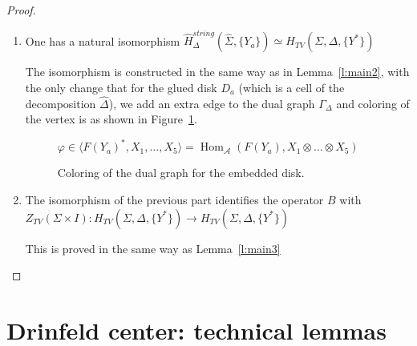 \documentclass{amsart}
\theoremstyle{definition}
\theoremstyle{remark}
\numberwithin{equation}{section}
\newcommand{\firef}[1]{Figure~{\rm\ref{#1}}}
\newcommand{\thref}[1]{Theorem~{\rm\ref{#1}}}
\newcommand{\leref}[1]{Lemma~{\rm\ref{#1}}}
\newcommand{\<}{\langle}
\renewcommand{\>}{\rangle}
\renewcommand{\i}{{\mathrm{i}}}   %
\newcommand{\A}{\mathcal{A}}      %
\newcommand{\Ga}{\Gamma}
\newcommand{\De}{\Delta}
\newcommand{\ph}{\varphi}
\newcommand{\Si}{\Sigma}
\newcommand{\Sihat}{\widehat{\Sigma}}
\newcommand{\Hs}{H^{string}}
\newcommand{\Hhs}{\hat{H}^{string}}
\newcommand{\HhsD}{\hat{H}^{string}_\De}
\newcommand{\HTV}{H_{TV}}
\newcommand{\ZTV}{Z_{TV}}
\DeclareMathOperator{\Hom}{Hom}
\DeclareMathOperator{\im}{Im}
\begin{document}
\begin{proof}
\begin{enumerate}
Then operators $B_p$ are mutually commuting projectors, and we have a
natural isomorphism  
$$
\Hs(\Si, \{Y_a\})\simeq \Hhs(\Sihat, \{Y_a\})=\im(B)
$$
where 
$$
B=\prod_{p\in \De^0} B_p\colon \HhsD(\Sihat, \{Y_a\})\to \HhsD(\Sihat, \{Y_a\})
$$
(compare with \thref{t:B_p}).


The proof of this result is quite similar to the proof of  \thref{t:B_p};
details are left to the reader. 

\item One has a  natural isomorphism $\HhsD(\Sihat, \{Y_a\})\simeq
\HTV(\Si, \De, \{Y^*\})$ 

The isomorphism is constructed in the same way as in \leref{l:main2}, with the only change that for the glued disk $D_a$ (which is a cell of the decomposition $\hat\De$), we add an extra edge to the dual graph $\Ga_\De$ and coloring of the vertex is as shown in \firef{f:dual_graph2}.
\begin{figure}[h]
\qquad 
$\ph\in \<F(Y_a)^*,X_1,\dots, X_5\>=\Hom_\A(F(Y_a), X_1\otimes\dots\otimes X_5)$
\caption{Coloring of the dual graph for the embedded disk.}\label{f:dual_graph2}
\end{figure}




\item  The isomorphism of the previous part identifies the operator $B$
with $\ZTV(\Si\times I)\colon H_{TV}(\Si, \De,\{Y^*\})\to H_{TV}(\Si,
\De,\{Y^*\})$ 

This is proved in the same way as \leref{l:main3}

\end{enumerate} 
\end{proof}



\section{Drinfeld center: technical lemmas}
\label{s:drinfeld_center}
\end{document}
